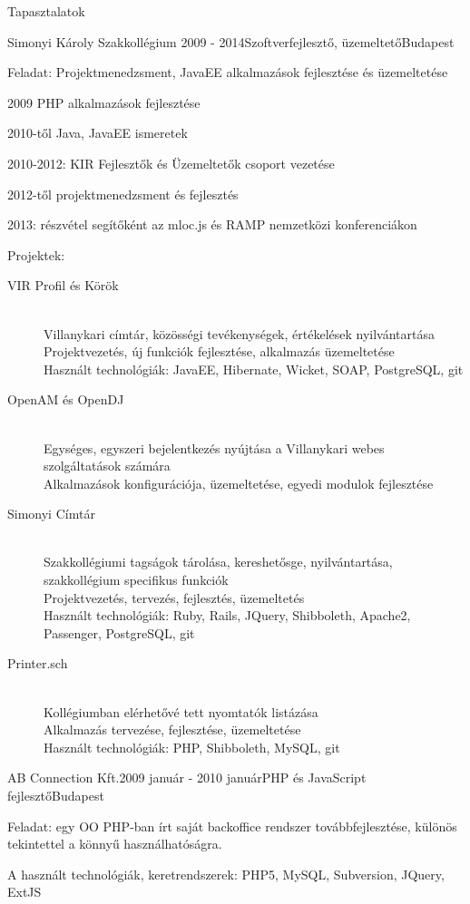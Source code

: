 \documentclass{resume} %
\begin{document}
\begin{rSection}{Tapasztalatok}
\begin{rSubsection}{Simonyi Károly Szakkollégium}
{2009 - 2014}{Szoftverfejlesztő, üzemeltető}{Budapest}
\item Feladat: Projektmenedzsment, JavaEE alkalmazások fejlesztése és üzemeltetése
\item 2009 PHP alkalmazások fejlesztése
\item 2010-től Java, JavaEE ismeretek
\item 2010-2012: KIR Fejlesztők és Üzemeltetők csoport vezetése
\item 2012-től projektmenedzsment és fejlesztés
\item 2013: részvétel segítőként az mloc.js és RAMP nemzetközi konferenciákon
\item Projektek:
	\begin{description}
		\item[VIR Profil és Körök] \hfill \\
		Villanykari címtár, közösségi tevékenységek, értékelések nyilvántartása \\
		Projektvezetés, új funkciók fejlesztése, alkalmazás üzemeltetése \\
		Használt technológiák: JavaEE, Hibernate, Wicket, SOAP, PostgreSQL, git
		\item[OpenAM és OpenDJ] \hfill \\
		Egységes, egyszeri bejelentkezés nyújtása a Villanykari webes szolgáltatások számára \\
		Alkalmazások konfigurációja, üzemeltetése, egyedi modulok fejlesztése
		\item[Simonyi Címtár] \hfill \\
		Szakkollégiumi tagságok tárolása, kereshetősge, nyilvántartása, szakkollégium specifikus funkciók \\
		Projektvezetés, tervezés, fejlesztés, üzemeltetés \\
		Használt technológiák: Ruby, Rails, JQuery, Shibboleth, Apache2, Passenger, PostgreSQL, git
		\item[Printer.sch] \hfill \\
		Kollégiumban elérhetővé tett nyomtatók listázása \\
		Alkalmazás tervezése, fejlesztése, üzemeltetése \\
		Használt technológiák: PHP, Shibboleth, MySQL, git
	\end{description}
\end{rSubsection}


\begin{rSubsection}{AB Connection Kft.}{2009 január - 2010 január}{PHP és JavaScript fejlesztő}{Budapest}
\item Feladat: egy OO PHP-ban írt saját backoffice rendszer továbbfejlesztése, különös
tekintettel a könnyű használhatóságra.
\item A használt technológiák, keretrendszerek: PHP5, MySQL, Subversion, JQuery, ExtJS
\end{rSubsection}


\end{rSection}
\end{document}
